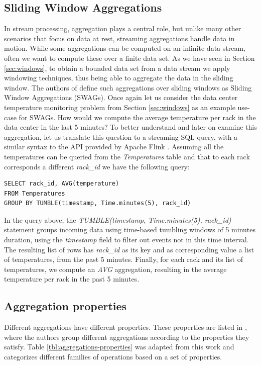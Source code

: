 \subsection{Sliding Window Aggregations}

In stream processing, aggregation plays a central role, but unlike many other scenarios that focus on data at rest, streaming aggregations handle data in motion. While some aggregations can be computed on an infinite data stream, often we want to compute these over a finite data set. As we have seen in Section \ref{sec:windows}, to obtain a bounded data set from a data stream we apply windowing techniques, thus being able to aggregate the data in the sliding window. The authors of \cite{Tangwongsan-Sliding-Window-Aggregation-Algorithms} define such aggregations over sliding windows as Sliding Window Aggregations (SWAGs). Once again let us consider the data center temperature monitoring problem from Section \ref{sec:windows} as an example use-case for SWAGs. How would we compute the average temperature per rack in the data center in the last 5 minutes? To better understand and later on examine this aggregation, let us translate this question to a streaming SQL query, with a similar syntax to the API provided by Apache Flink \cite{flink}. Assuming all the temperatures can be queried from the \textit{Temperatures} table and that to each rack corresponds a different \textit{rack\_id} we have the following query:

\begin{verbatim}
SELECT rack_id, AVG(temperature)
FROM Temperatures
GROUP BY TUMBLE(timestamp, Time.minutes(5), rack_id)
\end{verbatim}

In the query above, the \textit{TUMBLE(timestamp, Time.minutes(5), rack\_id)} statement groups incoming data using time-based tumbling windows of 5 minutes duration, using the \textit{timestamp} field to filter out events not in this time interval. The resulting list of rows has \textit{rack\_id} as its key and as corresponding value a list of temperatures, from the past 5 minutes. Finally, for each rack and its list of temperatures, we compute an \textit{AVG} aggregation, resulting in the average temperature per rack in the past 5 minutes.


\subsection{Aggregation properties}

Different aggregations have different properties. These properties are listed in \cite{Tangwongsan-Sliding-Window-Aggregation-Algorithms}, where the authors group different aggregations according to the properties they satisfy. Table \ref{tbl:aggregations-properties} was adapted from this work and categorizes different families of operations based on a set of properties.

